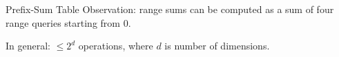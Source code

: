 \documentclass{beamer}
\theoremstyle{definition}
\theoremstyle{definition}
\begin{document}
\begin{frame}{Prefix-Sum Table}
    Observation: range sums can be computed as a sum of four range queries starting from 0.\cite{Ho97}

\begin{figure}
    \centering
    \subfigure{=}
    \subfigure{-}
    \subfigure{-}
    \subfigure{+}
\end{figure}
\pause
In general: $\leq 2^d$ operations, where $d$ is number of dimensions.
\end{frame}
\end{document}
